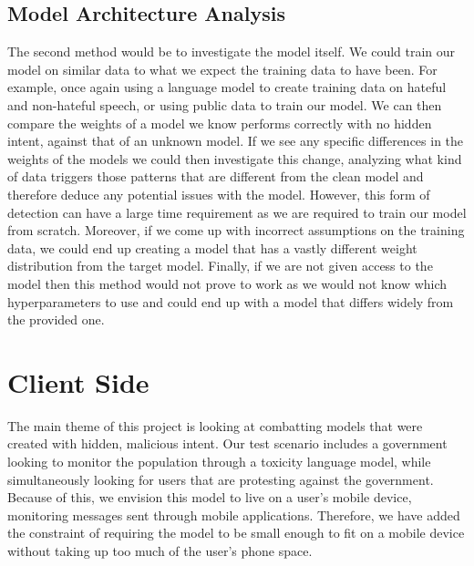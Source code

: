 \subsection{Model Architecture Analysis}

The second method would be to investigate the model itself. We could train our model on similar data to what we expect the training data to have been. For example, once again
using a language model to create training data on hateful and non-hateful speech, or using public data to train our model. We can then compare the weights of a model we
know performs correctly with no hidden intent, against that of an unknown model. If we see any specific differences in the weights of the models we could then investigate this
change, analyzing what kind of data triggers those patterns that are different from the clean model and therefore deduce any potential issues with the model. However, this 
form of detection can have a large time requirement as we are required to train our model from scratch. Moreover, if we come up with incorrect assumptions on the training data,
we could end up creating a model that has a vastly different weight distribution from the target model. Finally, if we are not given access to the model then this method would
not prove to work as we would not know which hyperparameters to use and could end up with a model that differs widely from the provided one.

\section{Client Side}

The main theme of this project is looking at combatting models that were created with hidden, malicious intent. Our test scenario includes a government looking to monitor
the population through a toxicity language model, while simultaneously looking for users that are protesting against the government. Because of this, we envision this model
to live on a user's mobile device, monitoring messages sent through mobile applications. Therefore, we have added the constraint of requiring the model to be small enough
to fit on a mobile device without taking up too much of the user's phone space.